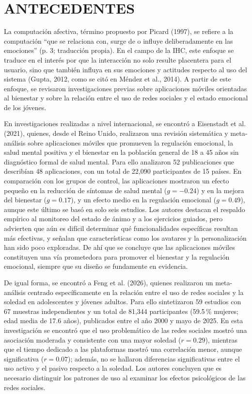 \section{ANTECEDENTES}
La computación afectiva, término propuesto por Picard (1997), se refiere a la computación ``que se relaciona con, surge de o influye deliberadamente en las emociones'' (p. 3; traducción propia). En el campo de la IHC, este enfoque se traduce en el interés por que la interacción no solo resulte placentera para el usuario, sino que también influya en sus emociones y actitudes respecto al uso del sistema (Gupta, 2012, como se citó en Méndez et al., 2014). A partir de este enfoque, se revisaron investigaciones previas sobre aplicaciones móviles orientadas al bienestar y sobre la relación entre el uso de redes sociales y el estado emocional de los jóvenes.

En investigaciones realizadas a nivel internacional, se encontró a Eisenstadt et al. (2021), quienes, desde el Reino Unido, realizaron una revisión sistemática y meta-análisis sobre aplicaciones móviles que promueven la regulación emocional, la salud mental positiva y el bienestar en la población general de 18 a 45 años sin diagnóstico formal de salud mental. Para ello analizaron 52 publicaciones que describían 48 aplicaciones, con un total de 22,090 participantes de 15 países. En comparación con los grupos de control, las aplicaciones mostraron un efecto pequeño en la reducción de síntomas de salud mental ($g = -0.24$) y en la mejora del bienestar ($g = 0.17$), y un efecto medio en la regulación emocional ($g = 0.49$), aunque este último se basó en solo seis estudios. Los autores destacan el respaldo empírico al monitoreo del estado de ánimo y a los ejercicios guiados, pero advierten que aún es difícil determinar qué funcionalidades específicas resultan más efectivas, y señalan que características como los avatares y la personalización han sido poco exploradas. De ahí que se concluye que las aplicaciones móviles constituyen una vía prometedora para promover el bienestar y la regulación emocional, siempre que su diseño se fundamente en evidencia.

De igual forma, se encontró a Feng et al. (2026), quienes realizaron un meta-análisis centrado específicamente en la relación entre el uso de redes sociales y la soledad en adolescentes y jóvenes adultos. Para ello sintetizaron 59 estudios con 67 muestras independientes y un total de 81,344 participantes (59.5\,\% mujeres; edad media de 17.6 años), publicados entre el año 2000 y mayo de 2025. En esta investigación se encontró que el uso problemático de las redes sociales mostró una asociación moderada y consistente con una mayor soledad ($r = 0.29$), mientras que el tiempo dedicado a las plataformas mostró una correlación menor, aunque significativa ($r = 0.07$); además, no se hallaron diferencias significativas entre el uso activo y el pasivo respecto a la soledad. Los autores concluyen que es necesario distinguir los patrones de uso al examinar los efectos psicológicos de las redes sociales.

